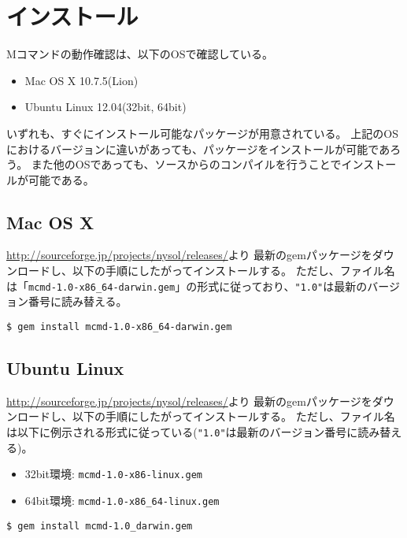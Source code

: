 
%

\section{インストール\label{sect:install}}
Mコマンドの動作確認は、以下のOSで確認している。
\begin{itemize}
\item Mac OS X 10.7.5(Lion)
\item Ubuntu Linux 12.04(32bit, 64bit)
\end{itemize}

いずれも、すぐにインストール可能なパッケージが用意されている。
上記のOSにおけるバージョンに違いがあっても、パッケージをインストールが可能であろう。
また他のOSであっても、ソースからのコンパイルを行うことでインストールが可能である。

\subsection{Mac OS X\label{sect:install_osx}}
\href{http://sourceforge.jp/projects/nysol/releases/}{http://sourceforge.jp/projects/nysol/releases/}より
最新のgemパッケージをダウンロードし、以下の手順にしたがってインストールする。
ただし、ファイル名は「\verb|mcmd-1.0-x86_64-darwin.gem|」の形式に従っており、\verb|"1.0"|は最新のバージョン番号に読み替える。

\begin{Verbatim}[baselinestretch=0.7,frame=single]
$ gem install mcmd-1.0-x86_64-darwin.gem
\end{Verbatim}

\subsection{Ubuntu Linux\label{sect:install_ubuntu}}
\href{http://sourceforge.jp/projects/nysol/releases/}{http://sourceforge.jp/projects/nysol/releases/}より
最新のgemパッケージをダウンロードし、以下の手順にしたがってインストールする。
ただし、ファイル名は以下に例示される形式に従っている(\verb|"1.0"|は最新のバージョン番号に読み替える)。
\begin{itemize}
\item 32bit環境: \verb|mcmd-1.0-x86-linux.gem|
\item 64bit環境: \verb|mcmd-1.0-x86_64-linux.gem|
\end{itemize}

\begin{Verbatim}[baselinestretch=0.7,frame=single]
$ gem install mcmd-1.0_darwin.gem
\end{Verbatim}

